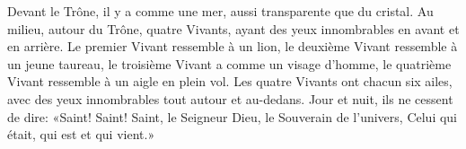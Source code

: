 Devant le Trône, il y a comme une mer, aussi transparente que du cristal.
Au milieu, autour du Trône, quatre Vivants,
	ayant des yeux innombrables en avant et en arrière.
Le premier Vivant ressemble à un lion,
	le deuxième Vivant ressemble à un jeune taureau,
	le troisième Vivant a comme un visage d’homme,
	le quatrième Vivant ressemble à un aigle en plein vol.
Les quatre Vivants ont chacun six ailes,
	avec des yeux innombrables tout autour et au-dedans.
Jour et nuit, ils ne cessent de dire:
	«Saint! Saint! Saint, le Seigneur Dieu, le Souverain de l’univers,
	Celui qui était, qui est et qui vient.»
